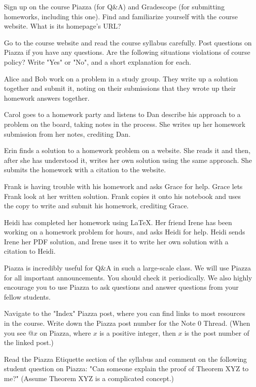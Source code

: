 
Sign up on the course Piazza (for Q\&A) and Gradescope (for submitting homeworks, including this one). Find and familiarize yourself with the course website. What is its homepage's URL?


Go to the course website and read the course syllabus carefully. Post questions on Piazza if you have any questions. Are the following situations violations of course policy? Write "Yes" or "No", and a short explanation for each.

\begin{Parts}
  \Part Alice and Bob work on a problem in a study group. They write up a solution together and submit it, noting on their submissions that they wrote up their homework answers together. 
  \nosolspace{3cm}
  
  \Part Carol goes to a homework party and listens to Dan describe his approach to a problem on the board, taking notes in the process. She writes up her homework submission from her notes, crediting Dan.
  \nosolspace{3cm}
  
  \Part Erin finds a solution to a homework problem on a website. She reads it and then, after she has understood it, writes her own solution using the same approach. She submits the homework with a citation to the website.
  \nosolspace{3cm}
  
  \Part Frank is having trouble with his homework and asks Grace for help. Grace lets Frank look at her written solution. Frank copies it onto his notebook and uses the copy to write and submit his homework, crediting Grace.
  \nosolspace{3cm}
  
  \Part Heidi has completed her homework using \LaTeX. Her friend Irene has been working on a homework problem for hours, and asks Heidi for help. Heidi sends Irene her PDF solution, and Irene uses it to write her own solution with a citation to Heidi.
  
\end{Parts}



Piazza is incredibly useful for Q\&A in such a large-scale class. We will use Piazza for all important announcements. You should check it periodically. We also highly encourage you to use Piazza to ask  questions and answer questions from your fellow students.

\begin{Parts}

    \Part Navigate to the "Index" Piazza post, where you can find links to most resources in the course. Write down the Piazza post number for the Note 0 Thread. (When you see @$x$ on Piazza, where $x$ is a positive integer, then $x$ is the post number of the linked post.)
  
    \Part Read the Piazza Etiquette section of the syllabus and comment on the following student question on Piazza: "Can someone explain the proof of Theorem XYZ to me?" (Assume Theorem XYZ is a complicated concept.)
  
\end{Parts}


